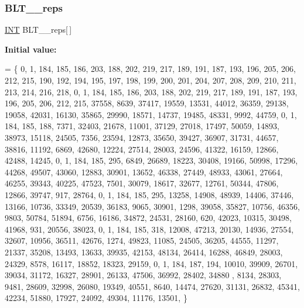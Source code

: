 \mbox{\label{data___b_l_t_8_c_a1fd8b25452c800b18efea9eff3d9cc33}} 
\subsubsection{\texorpdfstring{B\+L\+T\+\_\+\_\+reps}{BLT\_37\_reps}}
{\footnotesize\ttfamily \mbox{\hyperlink{galois_8h_a09fddde158a3a20bd2dcadb609de11dc}{I\+NT}} B\+L\+T\+\_\+\_\+reps\mbox{[}$\,$\mbox{]}}

{\bfseries Initial value\+:}
\begin{DoxyCode}
= \{
    0, 1, 184, 185, 186, 203, 188, 202, 219, 217, 189, 191, 187, 193, 196, 205, 206, 212, 215, 190, 192, 
      194, 195, 197, 198, 199, 200, 201, 204, 207, 208, 209, 210, 211, 213, 214, 216, 218, 
    0, 1, 184, 185, 186, 203, 188, 202, 219, 217, 189, 191, 187, 193, 196, 205, 206, 212, 215, 37558, 8639,
       37417, 19559, 13531, 44012, 36359, 29138, 19058, 42031, 16130, 35865, 29990, 18571, 14737, 19485, 48331, 
      9992, 44759, 
    0, 1, 184, 185, 188, 7371, 32403, 21678, 11001, 37129, 27018, 17497, 50059, 14893, 38973, 15118, 24505,
       7356, 23594, 12873, 35650, 39427, 36907, 31731, 44657, 38816, 11192, 6869, 42680, 12224, 27514, 28003, 
      24596, 41322, 16159, 12866, 42488, 14245, 
    0, 1, 184, 185, 295, 6849, 26689, 18223, 30408, 19166, 50998, 17296, 44268, 49507, 43060, 12883, 30901,
       13652, 46338, 27449, 48933, 43061, 27664, 46255, 39343, 40225, 47523, 7501, 30079, 18617, 32677, 12761, 
      50344, 47806, 12866, 39747, 917, 28764, 
    0, 1, 184, 185, 295, 13258, 14908, 48939, 14406, 37446, 13166, 10736, 33349, 20539, 36183, 9065, 30901,
       1298, 39058, 35827, 10756, 46356, 9803, 50784, 51894, 6756, 16186, 34872, 24531, 28160, 620, 42023, 10315, 
      30498, 41968, 931, 20556, 38023, 
    0, 1, 184, 185, 318, 12008, 47213, 20130, 14936, 27554, 32607, 10956, 36511, 42676, 1274, 49823, 11085,
       24505, 36205, 44555, 11297, 21337, 35208, 13493, 13633, 39935, 42153, 48134, 26414, 16288, 46849, 28003, 
      24329, 8578, 16117, 18852, 18323, 29159, 
    0, 1, 184, 187, 194, 10010, 39909, 26701, 39034, 31172, 16327, 28901, 26133, 47506, 36992, 28402, 34880
      , 8134, 28303, 9481, 28609, 32998, 26080, 19349, 40551, 8640, 14474, 27620, 31131, 26832, 45341, 42234, 
      51880, 17927, 24092, 49304, 11176, 13501, 
\}
\end{DoxyCode}
\mbox{\label{data___b_l_t_8_c_ac7300fadbff6aed7a3848f0bb0aafed1}} 
